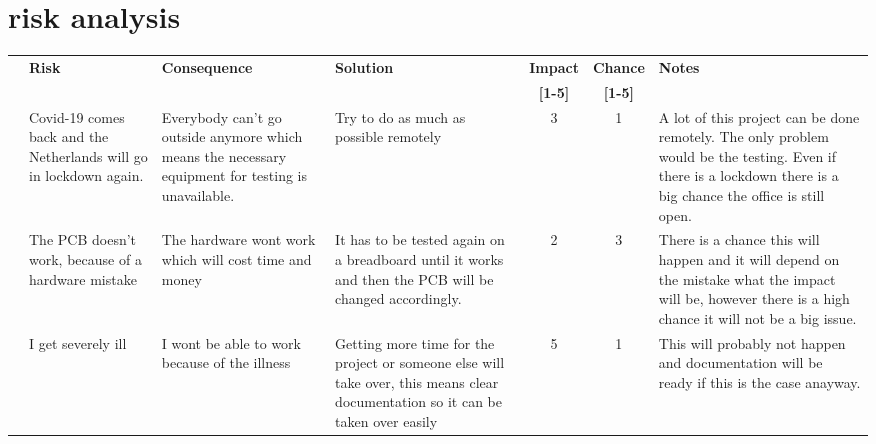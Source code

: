\newpage

\thispagestyle{empty}
\section{risk analysis}

\setcounter{riskTableCounter}{1}

\begin{longtable}{| c | p{3cm} | p{3cm} | p{4cm} | c | c | p{3cm} |}
    \hline
     & \textbf{Risk} & \textbf{Consequence} & \textbf{Solution} & \textbf{Impact} & \textbf{Chance} & \textbf{Notes} \\
    & & & & \textbf{[1-5]} & \textbf{[1-5]} & \\\hline
    \theriskTableCounter{} &
    \stepcounter{riskTableCounter}
    Covid-19 comes back and the Netherlands will go in lockdown again.& Everybody can't go outside anymore which means the necessary equipment for testing is unavailable. & 
    Try to do as much as possible remotely &
    3 &
    1 &
    A lot of this project can be done remotely. The only problem would be the testing. Even if there is a lockdown there is a big chance the office is still open. 
    \\ \hline
    \theriskTableCounter{} &
    \stepcounter{riskTableCounter}
    The PCB doesn't work, because of a hardware mistake&
    The hardware wont work which will cost time and money&
    It has to be tested again on a breadboard until it works and then the PCB will be changed accordingly. &
    2&
    3&
    There is a chance this will happen and it will depend on the mistake what the impact will be, however there is a high chance it will not be a big issue.
    \\\hline
    \theriskTableCounter{} &
    \stepcounter{riskTableCounter}
    I get severely ill & 
    I wont be able to work because of the illness &
    Getting more time for the project or someone else will take over, this means clear documentation so it can be taken over easily &
    5 &
    1 &
    This will probably not happen and documentation will be ready if this is the case anayway.

\end{longtable}
